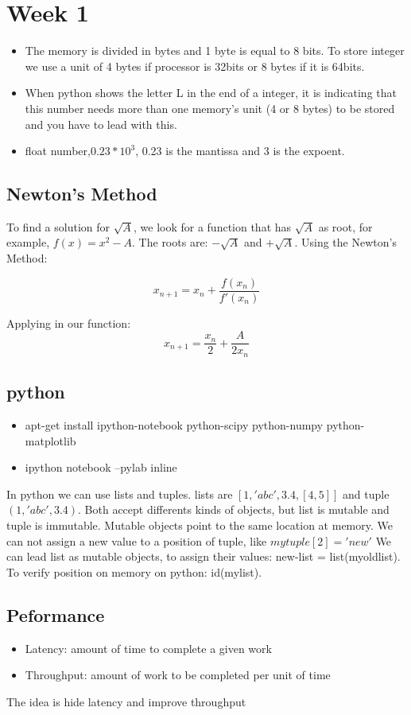 \section{Week 1}
\begin{itemize}
\item The memory is divided in bytes and 1 byte is equal to 8 bits. To store integer we use a unit of 4 bytes if processor is 32bits or 8 bytes if it is 64bits. 
\item When python shows the letter L in the end of a integer, it is indicating that this number needs more than one memory's unit (4 or 8 bytes) to be stored and you have to lead with this.
\item float number,$0.23 * 10^3$, 0.23 is the mantissa and 3 is the expoent. 
\end{itemize}

\subsection{Newton's Method}
To find a solution for $\sqrt{A}$, we look for a function that has $\sqrt{A}$ as root, for example, $f(x)=x^2-A$. The roots are: $-\sqrt{A}$ and $+\sqrt{A}$. Using the Newton's Method:

\begin{equation}
  x_{n+1} = x_n + \frac{f(x_n)}{f\prime(x_n)} 
\end{equation}

Applying in our function: 
\begin{equation}
  x_{n+1} = \frac{x_n}{2} + \frac{A}{2x_n}
\end{equation}

\subsection{python}
\begin{itemize}
  \item apt-get install ipython-notebook python-scipy python-numpy python-matplotlib
  \item ipython notebook --pylab inline
\end{itemize}

In python we can use lists and tuples. lists are $[1,'abc',3.4,[4,5]]$ and tuple $(1,'abc',3.4)$. 
Both accept differents kinds of objects, but list is mutable and tuple is immutable. Mutable objects point to the same location at memory. We can not assign a new value to a position of tuple, like $mytuple[2] = 'new'$
We can lead list as mutable objects, to assign their values: 
new-list = list(myoldlist). To verify position on memory on python: id(mylist).
\subsection{Peformance}
\begin{itemize}
  \item Latency: amount of time to complete a given work
  \item Throughput: amount of work to be completed per unit of time
\end{itemize}

The idea is hide latency and improve throughput
